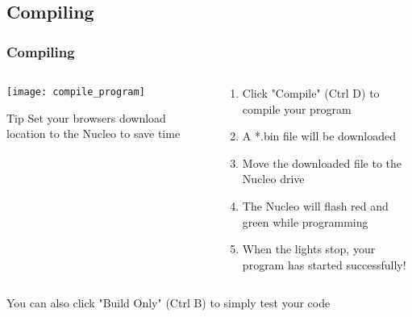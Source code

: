 \subsection{Compiling}
\label{sub:compiling}
\begin{frame}
	\frametitle{Compiling}
	\begin{columns}[c]
		\begin{column}{0.5\textwidth}
			\texttt{[image: compile\_program]}
			\begin{block}{Tip}
				Set your browsers download location to the Nucleo to save time
			\end{block}
		\end{column}
		\begin{column}{0.5\textwidth}
			\begin{enumerate}
				\item Click "Compile" (Ctrl D) to compile your program
				\item A *.bin file will be downloaded
				\item Move the downloaded file to the Nucleo drive
				\item The Nucleo will flash red and green while programming
				\item When the lights stop, your program has started successfully!
			\end{enumerate}
		\end{column}
	\end{columns}
	\begin{center}
		You can also click "Build Only" (Ctrl B) to simply test your code
	\end{center}
\end{frame}